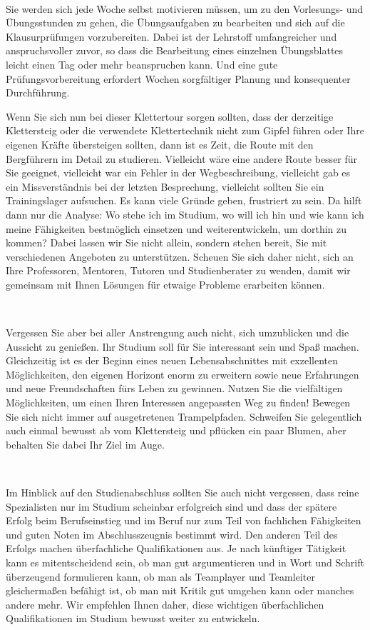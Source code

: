 {    \

    Sie werden sich jede Woche selbst motivieren müssen, um zu den Vorlesungs- und Übungsstunden zu gehen, die Übungsaufgaben zu bearbeiten und sich auf die Klausurprüfungen vorzubereiten. Dabei ist der Lehrstoff umfangreicher und anspruchsvoller zuvor, so dass die Bearbeitung eines einzelnen Übungsblattes leicht einen Tag oder mehr beanspruchen kann. Und eine gute Prüfungsvorbereitung erfordert Wochen sorgfältiger Planung und konsequenter Durchführung.

    Wenn Sie sich nun bei dieser Klettertour sorgen sollten, dass der derzeitige Klettersteig oder die verwendete Klettertechnik nicht zum Gipfel führen oder Ihre eigenen Kräfte übersteigen sollten, dann ist es Zeit, die Route mit den Bergführern im Detail zu studieren. Vielleicht wäre eine andere Route besser für Sie geeignet, vielleicht war ein Fehler in der Wegbeschreibung, vielleicht gab es ein Missverständnis bei der letzten Besprechung, vielleicht sollten Sie ein Trainingslager aufsuchen. Es kann viele Gründe geben, frustriert zu sein. Da hilft dann nur die Analyse: Wo stehe ich im Studium, wo will ich hin und wie kann ich meine Fähigkeiten bestmöglich einsetzen und weiterentwickeln, um dorthin zu kommen? Dabei lassen wir Sie nicht allein, sondern stehen bereit, Sie mit verschiedenen Angeboten zu unterstützen. Scheuen Sie sich daher nicht, sich an Ihre Professoren, Mentoren, Tutoren und Studienberater zu wenden, damit wir gemeinsam mit Ihnen Lösungen für etwaige Probleme erarbeiten können.

    \


    Vergessen Sie aber bei aller Anstrengung auch nicht, sich umzublicken und die Aussicht zu genießen. Ihr Studium soll für Sie interessant sein und Spaß machen. Gleichzeitig ist es der Beginn eines neuen Lebensabschnittes mit exzellenten Möglichkeiten, den eigenen Horizont enorm zu erweitern sowie neue Erfahrungen und neue Freundschaften fürs Leben zu gewinnen. Nutzen Sie die vielfältigen Möglichkeiten, um einen Ihren Interessen angepassten Weg zu finden! Bewegen Sie sich nicht immer auf ausgetretenen Trampelpfaden. Schweifen Sie gelegentlich auch einmal bewusst ab vom Klettersteig und pflücken ein paar Blumen, aber behalten Sie dabei Ihr Ziel im Auge.

    \

    Im Hinblick auf den Studienabschluss sollten Sie auch nicht vergessen, dass reine Spezialisten nur im Studium scheinbar erfolgreich sind und dass der spätere Erfolg beim Berufseinstieg und im Beruf nur zum Teil
    von fachlichen Fähigkeiten und guten Noten im Abschlusszeugnis bestimmt wird. Den anderen Teil des Erfolgs machen überfachliche Qualifikationen aus. Je nach künftiger Tätigkeit kann es mitentscheidend sein, ob man gut argumentieren und in Wort und Schrift überzeugend formulieren kann, ob man als Teamplayer und Teamleiter gleichermaßen befähigt ist, ob man mit Kritik gut umgehen kann oder manches andere mehr. Wir empfehlen Ihnen daher, diese wichtigen überfachlichen Qualifikationen im Studium bewusst weiter zu entwickeln.

}
